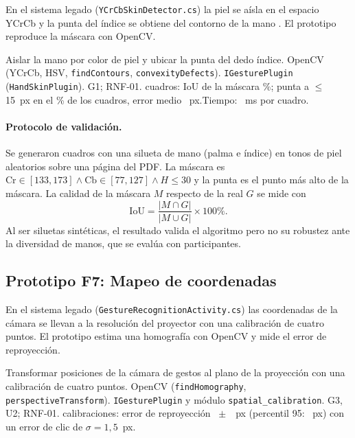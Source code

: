En el sistema legado (\texttt{YCrCbSkinDetector.cs}) la piel se aísla en el espacio YCrCb y la punta del índice se obtiene del contorno de la mano \citep{contreras2019}. El prototipo reproduce la máscara con OpenCV.

{Aislar la mano por color de piel y ubicar la punta del dedo índice.}
{OpenCV (YCrCb, HSV, \texttt{findContours}, \texttt{convexityDefects}).}
{\texttt{IGesturePlugin} (\texttt{HandSkinPlugin}).}
{G1; RNF-01.}
{ \FSeisCuadros{} cuadros: IoU de la máscara \FSeisIouPct\%; punta a $\leq$ 15~px en el \FSeisPuntaOkPct\% de los cuadros, error medio \FSeisErrorPuntaPx~px.\newline Tiempo: \FSeisTiempoMs~ms por cuadro.\newline {}}

\paragraph{Protocolo de validación.} Se generaron \FSeisCuadros{} cuadros con una silueta de mano (palma e índice) en tonos de piel aleatorios sobre una página del PDF. La máscara es $\mathrm{Cr}\in[133,173]\wedge\mathrm{Cb}\in[77,127]\wedge H\leq30$ y la punta es el punto más alto de la máscara. La calidad de la máscara $M$ respecto de la real $G$ se mide con
\begin{equation}
\mathrm{IoU}=\frac{|M\cap G|}{|M\cup G|}\times100\%.
\end{equation}
Al ser siluetas sintéticas, el resultado valida el algoritmo pero no su robustez ante la diversidad de manos, que se evalúa con participantes.

\subsection{Prototipo F7: Mapeo de coordenadas}

En el sistema legado (\texttt{GestureRecognitionActivity.cs}) las coordenadas de la cámara se llevan a la resolución del proyector con una calibración de cuatro puntos. El prototipo estima una homografía con OpenCV y mide el error de reproyección.

{Transformar posiciones de la cámara de gestos al plano de la proyección con una calibración de cuatro puntos.}
{OpenCV (\texttt{findHomography}, \texttt{perspectiveTransform}).}
{\texttt{IGesturePlugin} y módulo \texttt{spatial\_calibration}.}
{G3, U2; RNF-01.}
{ \FSieteEnsayos{} calibraciones: error de reproyección \FSieteErrorPx~$\pm$~\FSieteErrorSdPx~px (percentil 95: \FSietePPx~px) con un error de clic de $\sigma=1{,}5$~px.}

